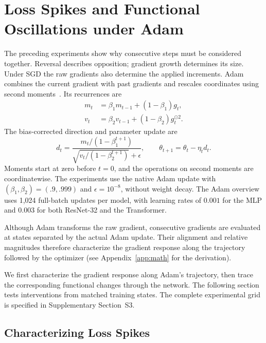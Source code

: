 \section{Loss Spikes and Functional Oscillations under Adam}
\label{sec:adam}\label{sec:adam-diagnostics}

The preceding experiments show why consecutive steps must be considered together. Reversal describes opposition; gradient growth determines its size. Under SGD the raw gradients also determine the applied increments. Adam combines the current gradient with past gradients and rescales coordinates using second moments~\cite{kingma2014adam}. Its recurrences are
\begin{equation}
 \begin{aligned}
 m_t&=\beta_1m_{t-1}+(1-\beta_1)g_t,\\
 v_t&=\beta_2v_{t-1}+(1-\beta_2)g_t^{\odot2}.
 \end{aligned}
 \label{eq:adam-moments}
\end{equation}
The bias-corrected direction and parameter update are
\begin{equation}
 d_t=\frac{m_t/(1-\beta_1^{t+1})}
 {\sqrt{v_t/(1-\beta_2^{t+1})}+\epsilon},\qquad
 \theta_{t+1}=\theta_t-\eta_t d_t.
 \label{eq:adam-update}
\end{equation}
Moments start at zero before $t=0$, and the operations on second moments are coordinatewise. The experiments use the native Adam update with $(\beta_1,\beta_2)=(.9,.999)$ and $\epsilon=10^{-8}$, without weight decay. The Adam overview uses 1,024 full-batch updates per model, with learning rates of $0.001$ for the MLP and $0.003$ for both ResNet-32 and the Transformer.

Although Adam transforms the raw gradient, consecutive gradients are evaluated at states separated by the actual Adam update. Their alignment and relative magnitudes therefore characterize the gradient response along the trajectory followed by the optimizer (see Appendix~\ref{app:math} for the derivation).

We first characterize the gradient response along Adam's trajectory, then trace the corresponding functional changes through the network. The following section tests interventions from matched training states. The complete experimental grid is specified in Supplementary Section~S3.

\subsection{Characterizing Loss Spikes}
\label{subsec:characterization}

